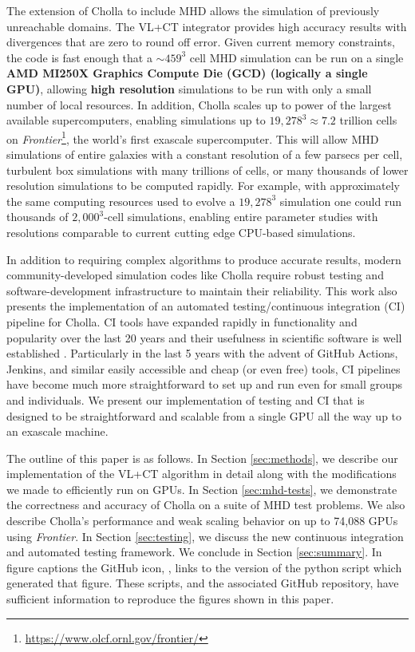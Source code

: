 \documentclass[modern, linenumbers]{aastex631}
\newcommand*{\img}[1]{%
    \raisebox{-.3\baselineskip}{%
        \texttt{[image: \#1]}%
    }%
}
\begin{document}
The extension of Cholla to include MHD allows the simulation of previously unreachable domains. The VL+CT integrator provides high accuracy results with divergences that are zero to round off error. Given current memory constraints, the code is fast enough that a $\sim459^3$ cell MHD simulation can be run on a single \textbf{AMD MI250X Graphics Compute Die (GCD) (logically a single GPU)}, allowing \textbf{high resolution} simulations to be run with only a small number of local resources. In addition, Cholla scales up to power of the largest available supercomputers, enabling simulations up to $19,278^3 \approx 7.2$ trillion cells on \textit{Frontier}\footnote{\url{https://www.olcf.ornl.gov/frontier/}}, the world's first exascale supercomputer. This will allow MHD simulations of entire galaxies with a constant resolution of a few parsecs per cell, turbulent box simulations with many trillions of cells, or many thousands of lower resolution simulations to be computed rapidly. For example, with approximately the same computing resources used to evolve a $19,278^3$ simulation one could run thousands of $2,000^3$-cell simulations, enabling entire parameter studies with resolutions comparable to current cutting edge CPU-based simulations.

In addition to requiring complex algorithms to produce accurate results, modern community-developed simulation codes like Cholla require robust testing and software-development infrastructure to maintain their reliability. This work also presents the implementation of an automated testing/continuous integration (CI) pipeline for Cholla. CI tools have expanded rapidly in functionality and popularity over the last 20 years and their usefulness in scientific software is well established \citep{beck_1999, wilson_2014,wilson_2017}. Particularly in the last 5 years with the advent of GitHub Actions, Jenkins, and similar easily accessible and cheap (or even free) tools, CI pipelines have become much more straightforward to set up and run even for small groups and individuals. We present our implementation of testing and CI that is designed to be straightforward and scalable from a single GPU all the way up to an exascale machine.

The outline of this paper is as follows. In Section \ref{sec:methods}, we describe our implementation of the VL+CT algorithm in detail along with the modifications we made to efficiently run on GPUs. In Section \ref{sec:mhd-tests}, we demonstrate the correctness and accuracy of Cholla on a suite of MHD test problems. We also describe Cholla's performance and weak scaling behavior on up to 74,088 GPUs using \textit{Frontier}. In Section \ref{sec:testing}, we discuss the new continuous integration and automated testing framework. We conclude in Section \ref{sec:summary}. In figure captions the GitHub icon, \img{github.png}, links to the version of the python script which generated that figure. These scripts, and the associated GitHub repository, have sufficient information to reproduce the figures shown in this paper.
\end{document}
